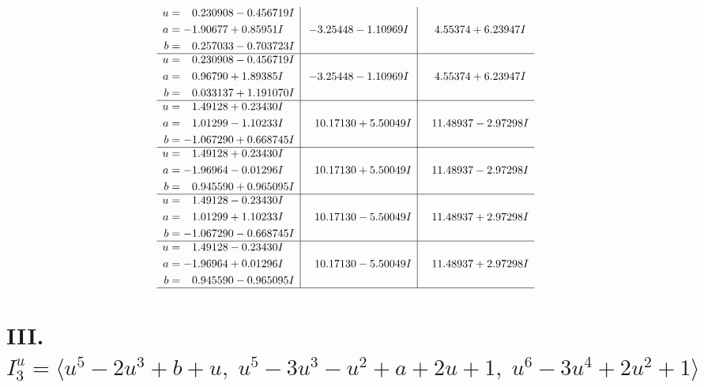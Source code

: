 \documentclass[1p]{elsarticle_modified}
\theoremstyle{definition}
\begin{document}
$$\begin{array}{c|c|c}
\begin{aligned}
u &= \phantom{-}0.230908 - 0.456719 I \\
a &= -1.90677 + 0.85951 I \\
b &= \phantom{-}0.257033 - 0.703723 I\end{aligned}
 & -3.25448 - 1.10969 I & \phantom{-}4.55374 + 6.23947 I \\ \hline\begin{aligned}
u &= \phantom{-}0.230908 - 0.456719 I \\
a &= \phantom{-}0.96790 + 1.89385 I \\
b &= \phantom{-}0.033137 + 1.191070 I\end{aligned}
 & -3.25448 - 1.10969 I & \phantom{-}4.55374 + 6.23947 I \\ \hline\begin{aligned}
u &= \phantom{-}1.49128 + 0.23430 I \\
a &= \phantom{-}1.01299 - 1.10233 I \\
b &= -1.067290 + 0.668745 I\end{aligned}
 & \phantom{-}10.17130 + 5.50049 I & \phantom{-}11.48937 - 2.97298 I \\ \hline\begin{aligned}
u &= \phantom{-}1.49128 + 0.23430 I \\
a &= -1.96964 - 0.01296 I \\
b &= \phantom{-}0.945590 + 0.965095 I\end{aligned}
 & \phantom{-}10.17130 + 5.50049 I & \phantom{-}11.48937 - 2.97298 I \\ \hline\begin{aligned}
u &= \phantom{-}1.49128 - 0.23430 I \\
a &= \phantom{-}1.01299 + 1.10233 I \\
b &= -1.067290 - 0.668745 I\end{aligned}
 & \phantom{-}10.17130 - 5.50049 I & \phantom{-}11.48937 + 2.97298 I \\ \hline\begin{aligned}
u &= \phantom{-}1.49128 - 0.23430 I \\
a &= -1.96964 + 0.01296 I \\
b &= \phantom{-}0.945590 - 0.965095 I\end{aligned}
 & \phantom{-}10.17130 - 5.50049 I & \phantom{-}11.48937 + 2.97298 I\\
 \hline 
 \end{array}$$\newpage\newpage\renewcommand{\arraystretch}{1}
\centering \section*{III. $I^u_{3}= \langle u^5-2 u^3+b+u,\;u^5-3 u^3- u^2+a+2 u+1,\;u^6-3 u^4+2 u^2+1 \rangle$}
\end{document}

